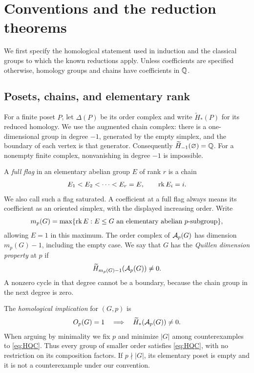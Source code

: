 \section{Conventions and the reduction theorems}\label{sec:reductions}

We first specify the homological statement used in induction and the
classical groups to which the known reductions apply. Unless coefficients
are specified otherwise, homology groups and chains have coefficients in $\mathbb Q$.

\subsection{Posets, chains, and elementary rank}
For a finite poset $P$, let $\Delta(P)$ be its order complex and write
$\widetilde H_*(P)$ for its reduced homology. We use the augmented chain complex:
there is a one-dimensional group in degree $-1$, generated by the empty
simplex, and the boundary of each vertex is that generator. Consequently
$\widetilde H_{-1}(\varnothing)=\mathbb Q$. For a nonempty finite complex,
nonvanishing in degree $-1$ is impossible.

A \emph{full flag} in an elementary abelian group $E$ of rank $r$ is a
chain
\[
E_1<E_2<\cdots<E_r=E,
\qquad \operatorname{rk} E_i=i.
\]
We also call such a flag saturated. A coefficient at a full flag always
means its coefficient as an oriented simplex, with the displayed
increasing order. Write
\[
m_p(G)=\max\{\operatorname{rk} E:E\leq G\text{ an elementary abelian }p\text{-subgroup}\},
\]
allowing $E=1$ in this maximum. The order complex of $\mathcal A_p(G)$ has
dimension $m_p(G)-1$, including the empty case. We say that $G$ has the
\emph{Quillen dimension property} at $p$ if
\begin{equation}\label{eq:QD}
\widetilde H_{m_p(G)-1}(\mathcal A_p(G))\ne0.
\end{equation}
A nonzero cycle in that degree cannot be a boundary, because the chain
group in the next degree is zero.

The \emph{homological implication} for $(G,p)$ is
\begin{equation}\label{eq:HQC}
O_p(G)=1\quad\Longrightarrow\quad
\widetilde H_*(\mathcal A_p(G))\ne0.
\end{equation}
When arguing by minimality we fix $p$ and minimize $|G|$ among
counterexamples to \eqref{eq:HQC}. Thus every group of smaller order
satisfies \eqref{eq:HQC}, with no restriction on its composition factors.
If $p\nmid|G|$, its elementary poset is empty and it is not a
counterexample under our convention.

